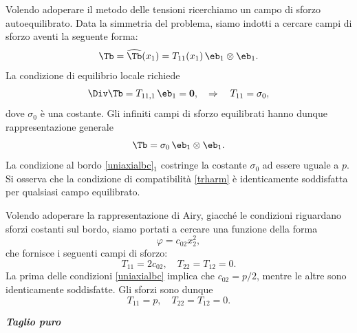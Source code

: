 Volendo adoperare il metodo delle tensioni ricerchiamo  un campo di sforzo autoequilibrato. Data la simmetria del problema, siamo indotti a cercare campi di sforzo aventi la seguente forma:
\begin{equation}
	\Tb=\widehat\Tb(x_1)=T_{11}(x_1)\,\eb_1\otimes\eb_1.
\end{equation}
La condizione di equilibrio locale richiede
\begin{equation}
	\Div\Tb=T_{11,1}\, \eb_1 =\mathbf{0}, \quad \Rightarrow\quad T_{11}=\sigma_0,
\end{equation}
dove $\sigma_0$ è una costante. Gli infiniti campi di sforzo equilibrati hanno dunque rappresentazione generale
\begin{equation}
	\Tb=\sigma_0\,\eb_1\otimes \eb_1.
\end{equation}
La condizione al bordo \eqref{uniaxialbc}$_1$ costringe la costante $\sigma_0$ ad essere uguale a $p$.
Si osserva che la condizione di compatibilità \eqref{trharm} è identicamente soddisfatta per qualsiasi campo equilibrato. 

Volendo adoperare la rappresentazione di Airy, giacché le condizioni riguardano sforzi costanti sul bordo, siamo portati a cercare una funzione  della forma
\begin{equation}
	\varphi=c_{02}x_2^2,
\end{equation}
che fornisce i seguenti campi di sforzo:
\begin{equation}
T_{11}=2c_{02}, \quad T_{22}=T_{12}=0.
\end{equation}
La prima delle condizioni \eqref{uniaxialbc} implica che $c_{02}=p/2$, mentre le altre sono identicamente soddisfatte. Gli sforzi sono dunque
\begin{equation}
T_{11}=p, \quad T_{22}=T_{12}=0.
\end{equation}


\vspace{.5cm}

\noindent\textsf{\small\textit{\textbf{Taglio puro}}}

